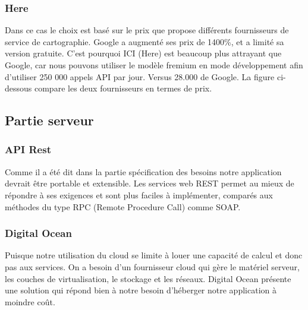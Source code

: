 \subsubsection{Here} %
\label{ssub:here}
Dans ce cas le choix est basé sur le prix que propose différents fournisseurs de service de cartographie.\newline
Google a augmenté ses prix de 1400\%, et a limité sa version gratuite. C'est pourquoi ICI (Here) est beaucoup plus attrayant que Google, car nous pouvons utiliser le modèle fremium en mode développement afin d'utiliser 250 000 appels API par jour. Versus 28.000 de Google.\newline
La figure ci-dessous compare les deux fournisseurs en termes de prix.\cite{heremaps}

\subsection{Partie serveur} %
\label{sub:partie_serveur}

\subsubsection{API Rest} %
\label{ssub:api_rest}
Comme il a été dit dans la partie spécification des besoins notre application devrait être portable et extensible. Les services web REST permet au mieux de répondre à ses exigences et sont plus faciles à implémenter, comparés aux méthodes du type RPC (Remote Procedure Call) comme SOAP.
\subsubsection{Digital Ocean} %
\label{ssub:digital_ocean}
Puisque notre utilisation du cloud se limite à louer une capacité de calcul et donc pas aux services. On a besoin d'un fournisseur cloud qui gère le matériel serveur, les couches de virtualisation, le stockage et les réseaux.\newline
Digital Ocean présente une solution qui répond bien à notre besoin d'héberger notre application à moindre coût.\cite{digitalocean}

